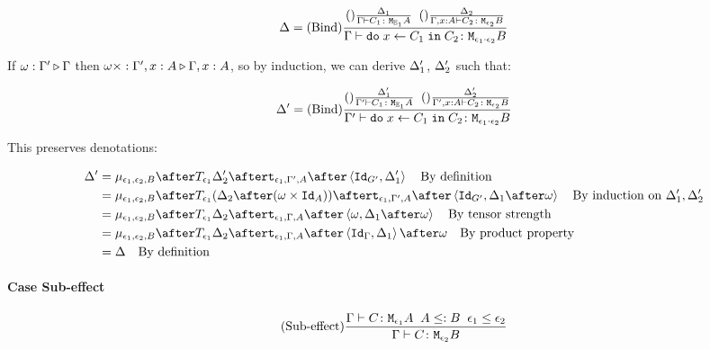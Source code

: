 \documentclass{report}
\begin{document}
    \begin{equation}
        \Delta = (\text{Bind}) \frac{
            (\text{}) \frac{\Delta_1}{\Gamma \vdash C_1 \colon \texttt{M}_{\mathbb{E}_1}{A}}
            \;\;
            (\text{}) \frac{\Delta_2}{\Gamma,x: A \vdash C_2 \colon \texttt{M}_{\epsilon_2}{B}}
        }{
            \Gamma \vdash \texttt{do}\; x \leftarrow C_1 \;\texttt{in}\; C_2 \colon \texttt{M}_{\epsilon_1\cdot\epsilon_2}{B}
        }
    \end{equation}

    If $\omega : \Gamma' \triangleright \Gamma$ then $\omega\times : \Gamma',x:A \triangleright \Gamma, x: A$, so by induction, we can derive $\Delta_1'$, $\Delta_2'$ such that:

    \begin{equation}
        \Delta' = (\text{Bind}) \frac{
            (\text{}) \frac{\Delta_1'}{\Gamma' \vdash C_1 \colon \texttt{M}_{\mathbb{E}_1}{A}}
            \;\;
            (\text{}) \frac{\Delta_2'}{\Gamma',x: A \vdash C_2 \colon \texttt{M}_{\epsilon_2}{B}}
        }{
            \Gamma' \vdash \texttt{do}\; x \leftarrow C_1 \;\texttt{in}\; C_2 \colon \texttt{M}_{\epsilon_1\cdot\epsilon_2}{B}
        }
    \end{equation}

    This preserves denotations:

    \begin{align}
        \D' & = \bind{\e_1}{\e_2}{B}\after\T{\e_1}{\D_2'}\after\tstrength{\e_1}{\G'}{A}\after\pr{\Id{G'}}{\D_1'}\qt{By definition}\\
        & = \bind{\e_1}{\e_2}{B}\after\T{\e_1}{(\D_2\after(\w\times\Id{A}))}\after\tstrength{\e_1}{\G'}{A}\after\pr{\Id{G'}}{\D_1\after\w}\qt{By induction on $\D_1', \D_2'$}\\
        & = \bind{\e_1}{\e_2}{B}\after\T{\e_1}{\D_2}\after\tstrength{\e_1}{\G}{A}\after\pr{\w}{\D_1\after\w}\qt{By tensor strength}\\
        & = \bind{\e_1}{\e_2}{B}\after\T{\e_1}{\D_2}\after\tstrength{\e_1}{\G}{A}\after\pr{\idg}{\D_1}\after\w\qt{By product property}\\
        & = \D \qt{By definition}
    \end{align}





    \paragraph{Case Sub-effect}


    \begin{equation}
        (\text{Sub-effect}) \frac{\Gamma \vdash C \colon \texttt{M}_{\epsilon_1}{A}\;\; A\leq: B\;\; \epsilon_1\leq\epsilon_2}{\Gamma \vdash C \colon \texttt{M}_{\epsilon_2}{B}}
    \end{equation}
\end{document}
